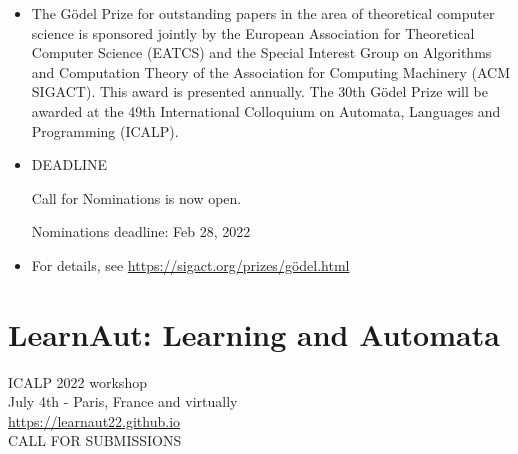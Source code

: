 \documentclass[prodmode,acmtecs]{acmsmall} %
\begin{document}
\begin{itemize}\item  The  Gödel Prize for outstanding papers in the area of theoretical computer science is sponsored jointly by the European Association for Theoretical Computer Science (EATCS) and the Special Interest Group on Algorithms and Computation Theory of the Association for Computing Machinery (ACM SIGACT). This award is presented annually. The 30th Gödel Prize will be awarded at the 49th International Colloquium on Automata, Languages and Programming (ICALP). 
 
\item  DEADLINE 
 
  Call for Nominations is now open. 
 
Nominations deadline: Feb 28, 2022 
 
\item  For details, see \href{https://sigact.org/prizes/g%C3%B6del.html}{https://sigact.org/prizes/gödel.html} 
 
\end{itemize}\section{LearnAut: Learning and Automata }\label{LearnAut}  ICALP 2022 workshop\\ 
  July 4th - Paris, France and virtually\\ 
  \href{https://learnaut22.github.io}{https://learnaut22.github.io}\\ 
CALL FOR SUBMISSIONS 
\end{document}
